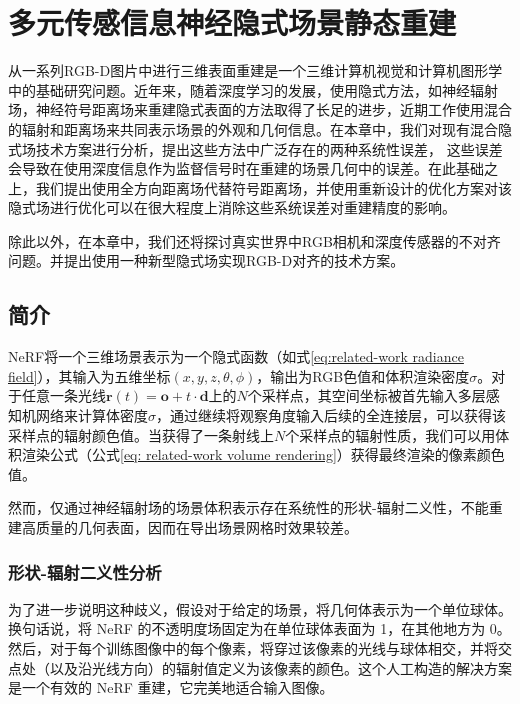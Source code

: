 \chapter{多元传感信息神经隐式场景静态重建}
\label{chapter: omninerf}
从一系列RGB-D图片中进行三维表面重建是一个三维计算机视觉和计算机图形学中的基础研究问题。近年来，随着深度学习的发展，使用隐式方法，如神经辐射场\cite{mildenhall_nerf_2020}，神经符号距离场\cite{wang_neus_2021}来重建隐式表面的方法取得了长足的进步，近期工作\cite{wang_neus_2021, azinovic_neural_2022}使用混合的辐射和距离场来共同表示场景的外观和几何信息。在本章中，我们对现有混合隐式场技术方案进行分析，提出这些方法中广泛存在的两种系统性误差， 这些误差会导致在使用深度信息作为监督信号时在重建的场景几何中的误差。在此基础之上，我们提出使用全方向距离场\cite{houchens_neuralodf_2022}代替符号距离场，并使用重新设计的优化方案对该隐式场进行优化可以在很大程度上消除这些系统误差对重建精度的影响。

除此以外，在本章中，我们还将探讨真实世界中RGB相机和深度传感器的不对齐问题。并提出使用一种新型隐式场实现RGB-D对齐的技术方案。

\section{简介}
NeRF\cite{mildenhall_nerf_2020}将一个三维场景表示为一个隐式函数（如式\ref{eq:related-work radiance field}），其输入为五维坐标$(x,y,z,\theta,\phi)$，输出为RGB色值和体积渲染密度$\sigma$。对于任意一条光线$\mathbf{r}(t) = \mathbf{o} + t\cdot\mathbf{d}$上的$N$个采样点，其空间坐标被首先输入多层感知机网络来计算体密度$\sigma$，通过继续将观察角度输入后续的全连接层，可以获得该采样点的辐射颜色值。当获得了一条射线上$N$个采样点的辐射性质，我们可以用体积渲染公式（公式\ref{eq: related-work volume rendering}）获得最终渲染的像素颜色值。

然而，仅通过神经辐射场的场景体积表示存在系统性的形状-辐射二义性\cite{zhang_nerf_2020}，不能重建高质量的几何表面，因而在导出场景网格时效果较差。

\subsection{形状-辐射二义性分析}

为了进一步说明这种歧义，假设对于给定的场景，将几何体表示为一个单位球体。换句话说，将 NeRF 的不透明度场固定为在单位球体表面为 1，在其他地方为 0。然后，对于每个训练图像中的每个像素，将穿过该像素的光线与球体相交，并将交点处（以及沿光线方向）的辐射值定义为该像素的颜色。这个人工构造的解决方案是一个有效的 NeRF 重建，它完美地适合输入图像。


